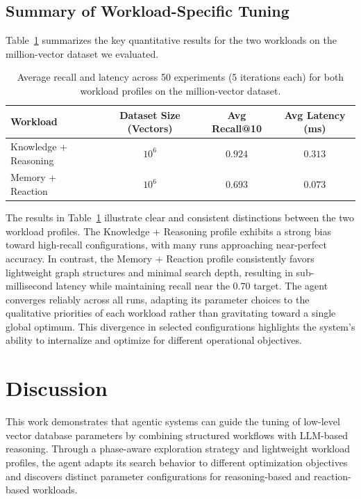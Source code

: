 \documentclass{article}
\begin{document}
\subsection{Summary of Workload-Specific Tuning}

Table~\ref{tab:workload-results} summarizes the key quantitative results for the two workloads on
the million-vector dataset we evaluated.

\begin{table}[h]
\centering
\begin{tabular}{l|c|c|c}
\textbf{Workload} & \textbf{Dataset Size (Vectors)} & \textbf{Avg Recall@10} & \textbf{Avg Latency (ms)}\\
\hline
Knowledge + Reasoning & $10^6$ & $0.924$ & $0.313$ \\
Memory + Reaction & $10^6$ & $0.693$ & $0.073$ \\
\end{tabular}
\caption{Average recall and latency across 50 experiments (5 iterations each) for both workload profiles on the million-vector dataset.}
\label{tab:workload-results}
\end{table}

The results in Table~\ref{tab:workload-results} illustrate clear and consistent distinctions between the two workload profiles. The Knowledge + Reasoning profile exhibits a strong bias toward high-recall configurations, with many runs approaching near-perfect accuracy. In contrast, the Memory + Reaction profile consistently favors lightweight graph structures and minimal search depth, resulting in sub-millisecond latency while maintaining recall near the 0.70 target. The agent converges reliably across all runs, adapting its parameter choices to the qualitative priorities of each workload rather than gravitating toward a single global optimum. This divergence in selected configurations highlights the system’s ability to internalize and optimize for different operational objectives.



\section{Discussion}

This work demonstrates that agentic systems can guide the tuning of low-level vector database
parameters by combining structured workflows with LLM-based reasoning. Through a phase-aware
exploration strategy and lightweight workload profiles, the agent adapts its search behavior to
different optimization objectives and discovers distinct parameter configurations for reasoning-based
and reaction-based workloads.
\end{document}
